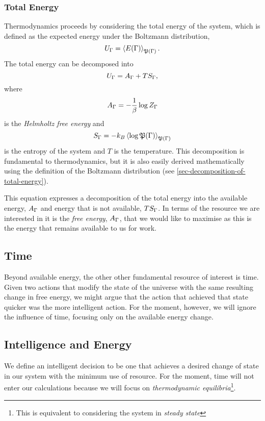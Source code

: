 \documentclass[]{article}
\begin{document}
\subsubsection{Total Energy}

Thermodynamics proceeds by considering the total energy of the system, which is defined as the expected energy under the Boltzmann distribution,
\[
U_\Gamma = \left\langle E(\Gamma) \right\rangle_{\mathfrak{P}(\Gamma)}.
\] 
The total energy can be decomposed into
\[
U_\Gamma = A_\Gamma + TS_\Gamma,
\] 
where 
\[
A_\Gamma = - \frac{1}{\beta}\log Z_\Gamma
\] 
is the \emph{Helmholtz free energy} and 
\[ S_\Gamma = -k_B
\left\langle \log \mathfrak{P}(\Gamma) \right\rangle_{\mathfrak{P}(\Gamma)}
\] 
is the entropy of the system and \(T\) is the temperature. This decomposition is fundamental to thermodynamics, but it is also easily derived mathematically using the definition of the Boltzmann distribution (see \ref{sec-decomposition-of-total-energy}).

This equation expresses a decomposition of the total
energy into the available energy, \(A_\Gamma\) and energy
that is not available, \(TS_\Gamma\). In terms of the resource we are interested in it is the \emph{free energy}, $A_\Gamma$, that we would like to maximise as this is the energy that remains available to us for work.

\subsection{Time}

Beyond available energy, the other other fundamental resource of interest is time. Given two actions that modify the state of the universe with the same resulting change in free energy, we might argue that the action that achieved that state quicker was the more intelligent action. For the moment, however, we will ignore the influence of time, focusing only on the available energy change. 

\subsection{Intelligence and Energy} \label{sec-intelligence-and-energy}

We define an intelligent decision to be one that achieves a desired
change of state in our system with the minimum use of resource. For the
moment, time will not enter our calculations because we will focus on
\emph{thermodynamic equilibria}\footnote{This is equivalent to considering the system in \emph{steady state}}.
\end{document}
